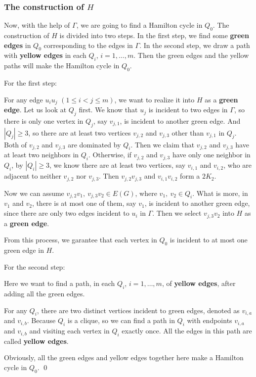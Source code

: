 \documentclass{amsart}
\begin{document}
\subsubsection{The construction of $H$}
Now, with the help of $\Gamma$, we are going to find a Hamilton cycle in $Q_0$. 
The construction of $H$ is divided into two steps. In the first step, we find some {\bf green edges} in $Q_0$ corresponding to the edges in $\Gamma$. In the second step, we draw a path with {\bf yellow edges} in each $Q_i$, $i=1,\ldots,m$. Then the green edges and the yellow paths will make the Hamilton cycle in $Q_0$.

For the first step:

For any edge $u_iu_j$ $(1\le i<j\le m)$, we want to realize it into $H$ as a {\bf green edge}. Let us look at $Q_j$ first. We know that $u_j$ is incident to two edges in $\Gamma$, so there is only one vertex in $Q_j$, say $v_{j,1}$, is incident to another green edge. And $|Q_j|\ge3$, so there are at least two vertices $v_{j,2}$ and $v_{j,3}$ other than $v_{j,1}$ in $Q_j$. Both of $v_{j,2}$ and $v_{j,3}$ are dominated by $Q_i$. Then we claim that $v_{j,2}$ and $v_{j,3}$ have at least two neighbors in $Q_i$. Otherwise, if $v_{j,2}$ and $v_{j,3}$ have only one neighbor in $Q_i$, by $|Q_i|\ge3$, we know there are at least two vertices, say $v_{i,1}$ and $v_{i,2}$, who are adjacent to neither $v_{j,2}$ nor $v_{j,3}$. Then $v_{j,2}v_{j,3}$ and $v_{i,1}v_{i,2}$ form a $2K_2$.

Now we can assume $v_{j,2}v_1,~v_{j,3}v_2\in E(G)$, where $v_1,~v_2\in Q_i$. What is more, in $v_1$ and $v_2$, there is at most one of them, say $v_1$, is incident to another green edge, since there are only two edges incident to $u_i$ in $\Gamma$. Then we select $v_{j,3}v_2$ into $H$ as a {\bf green edge}.

From this process, we garantee that each vertex in $Q_0$ is incident to at most one green edge in $H$.

For the second step:

Here we want to find a path, in each $Q_i$, $i=1,\dots,m$, of {\bf yellow edges}, after adding all the green edges.

For any $Q_i$, there are two distinct vertices incident to green edges, denoted as $v_{i,a}$ and $v_{i,b}$. Because $Q_i$ is a clique, so we can find a path in $Q_i$ with endpoints $v_{i,a}$ and $v_{i,b}$ and visiting each vertex in $Q_i$ exactly once. All the edges in this path are called {\bf yellow edges}.

Obviously, all the green edges and yellow edges together here make a Hamilton cycle in $Q_0$.  \qed
\end{document}
